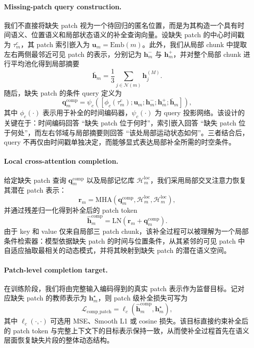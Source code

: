 \paragraph{Missing-patch query construction.}
我们不直接将缺失 patch 视为一个待回归的匿名位置，而是为其构造一个具有时间语义、位置语义和局部状态语义的补全查询向量。设缺失 patch 的中心时间戳为 $\tau_m^{c}$，其 patch 索引嵌入为 $\bm{u}_m = \mathrm{Emb}(m)$。此外，我们从局部 chunk 中提取左右两侧最邻近可见 patch 的表示，分别记为 $\bm{h}_m^{-}$ 与 $\bm{h}_m^{+}$，并对整个局部 chunk 进行平均池化得到局部摘要
\begin{equation}
\bar{\bm{h}}_m = \frac{1}{3} \sum_{j \in \mathcal{N}(m)} \bm{h}_{j}^{(M)}.
\end{equation}
随后，缺失 patch 的条件 query 定义为
\begin{equation}
\bm{q}_m^{\mathrm{comp}} =
\psi_c\!\left(
\left[
\phi_c(\tau_m^{c});
\bm{u}_m;
\bm{h}_m^{-};
\bm{h}_m^{+};
\bar{\bm{h}}_m
\right]
\right),
\end{equation}
其中 $\phi_c(\cdot)$ 表示用于补全的时间编码器，$\psi_c(\cdot)$ 为 query 投影网络。该设计的关键在于：时间编码回答 ``缺失 patch 位于何时''，索引嵌入回答 ``缺失 patch 位于何处''，而左右邻域与局部摘要则回答 ``该处局部运动状态如何''。三者结合后，query 不再仅由时间戳单独决定，而能够显式表达局部补全所需的时空条件。

\paragraph{Local cross-attention completion.}
给定缺失 patch 查询 $\bm{q}_m^{\mathrm{comp}}$ 以及局部记忆库 $\mathcal{H}_m^{\mathrm{loc}}$，我们采用局部交叉注意力恢复其潜在 patch 表示：
\begin{equation}
\bm{r}_m = \mathrm{MHA}\!\left(\bm{q}_m^{\mathrm{comp}}, \mathcal{H}_m^{\mathrm{loc}}, \mathcal{H}_m^{\mathrm{loc}}\right),
\end{equation}
并通过残差归一化得到补全后的 patch token
\begin{equation}
\hat{\bm{h}}_m^{\mathrm{comp}} = \mathrm{LN}\!\left(\bm{r}_m + \bm{q}_m^{\mathrm{comp}}\right).
\end{equation}
由于 key 和 value 仅来自局部三 patch chunk，该补全过程可以被理解为一个局部条件检索器：模型依据缺失 patch 的时间与位置条件，从其紧邻的可见 patch 中自适应抽取最相关的动态模式，并将其映射到缺失 patch 的潜在语义空间。

\paragraph{Patch-level completion target.}
在训练阶段，我们将由完整输入编码得到的真实 patch 表示作为监督目标。记对应缺失 patch 的教师表示为 $\bm{h}_m^{\star}$，则 patch 级补全损失可写为
\begin{equation}
\mathcal{L}_{\mathrm{comp\_patch}} =
\ell_c\!\left(\hat{\bm{h}}_m^{\mathrm{comp}}, \bm{h}_m^{\star}\right),
\end{equation}
其中 $\ell_c(\cdot,\cdot)$ 可选用 MSE、Smooth L1 或 cosine 损失。该目标直接约束补全后的 patch token 与完整上下文下的目标表示保持一致，从而使补全过程首先在语义层面恢复缺失片段的整体动态结构。

